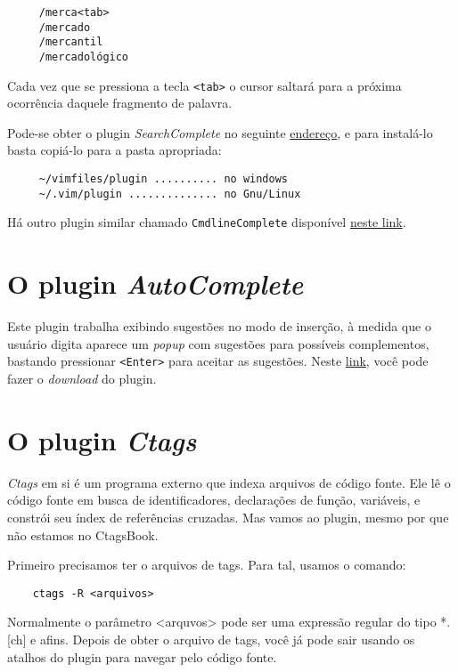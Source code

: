 \begin{verbatim}
     /merca<tab>
     /mercado
     /mercantil
     /mercadológico
\end{verbatim}

Cada vez que se pressiona a tecla {\tt <tab>} o cursor saltará para 
a próxima ocorrência daquele fragmento de palavra.

Pode-se obter o plugin {\em SearchComplete} no seguinte 
\href{http://www.vim.org/scripts/script.php?script\_id=474}{endereço}, 
e para instalá-lo basta copiá-lo para a pasta apropriada:
    
\begin{verbatim}
     ~/vimfiles/plugin .......... no windows
     ~/.vim/plugin .............. no Gnu/Linux
\end{verbatim}

Há outro plugin similar chamado {\tt CmdlineComplete} disponível  
\href{http://www.vim.org/scripts/script.php?script\_id=2222}{neste link}.


\section{O plugin {\em AutoComplete}}\label{sec:O Plugin AutoComplete}
Este plugin trabalha exibindo sugestões no modo de inserção, à
medida que o usuário digita aparece um {\em popup} com sugestões para possíveis
complementos, bastando pressionar {\tt <Enter>} para aceitar as sugestões.
Neste \href{http://www.vim.org/scripts/script.php?script\_id=1879}{link}, você pode
fazer o {\em download} do plugin.

\section{O plugin {\em Ctags}}
\label{sec:O Plugin Ctags}

{\em Ctags} em si é um programa externo que indexa arquivos de código fonte. Ele lê
o código fonte em busca de identificadores, declarações de função, variáveis, e constrói seu 
índex de referências cruzadas. Mas vamos ao plugin, mesmo por que não estamos no CtagsBook.

Primeiro precisamos ter o arquivos de tags. Para tal, usamos o comando:

\begin{verbatim}
    ctags -R <arquivos>
\end{verbatim}

Normalmente o parâmetro <arquvos> pode ser uma expressão regular do tipo *.[ch] e afins. Depois
de obter o arquivo de tags, você já pode sair usando os atalhos do plugin para navegar pelo 
código fonte. 

